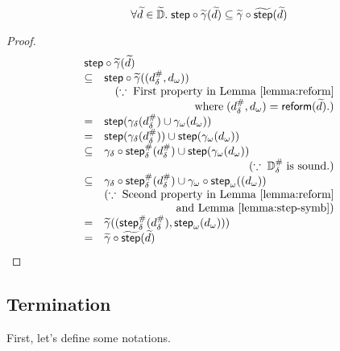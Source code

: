 \begin{lemma}\label{lemma:comb-sound2}
  \[
    \forall \widetilde{d} \in \widetilde{\mathbb{D}}. \; \textsf{step} \circ \widetilde{\gamma}(\widetilde{d}) \subseteq
    \widetilde{\gamma} \circ \widetilde{\textsf{step}}(\widetilde{d})\\
  \]
\end{lemma}
\begin{proof}
  \[
    \begin{array}{cl}
      \multicolumn{2}{l}{
        \step \circ \combgamma(\combelem)
      }\\
      \subseteq& \step \circ \combgamma((\sabselem, \symbelem))\\
       & \multicolumn{1}{r}{(\because \; \text{First property in
       Lemma~\ref{lemma:reform}}}\\
       & \multicolumn{1}{r}{\text{where} \; (\sabselem, \symbelem)
       = \reform(\combelem).)}\\

      =& \step(\sgamma(\sabselem) \cup \symbgamma(\symbelem))\\
      =& \step(\sgamma(\sabselem)) \cup \step(\symbgamma(\symbelem))\\
      \subseteq& \sgamma \circ \sabsstep(\sabselem) \cup \step(\symbgamma(\symbelem))\\
      & \multicolumn{1}{r}{(\because \; \sabsdom \; \text{is sound.})}\\
      \subseteq& \sgamma \circ \sabsstep(\sabselem) \cup \symbgamma \circ
      \symbstep((\symbelem))\\
               & \multicolumn{1}{r}{(\because \; \text{Sceond property in
               Lemma~\ref{lemma:reform}} }\\
               & \multicolumn{1}{r}{\text{and Lemma~\ref{lemma:step-symb}})}\\
      =& \combgamma((\sabsstep(\sabselem), \symbstep(\symbelem)))\\
      =& \combgamma \circ \combstep(\combelem)\\
    \end{array}
  \]
\end{proof}

\subsection{Termination}

First, let's define some notations.

